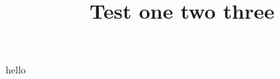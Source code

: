 \documentclass[12pt]{report}
\title{Test one two three}
\begin{document}
\maketitle
hello
\end{document}
